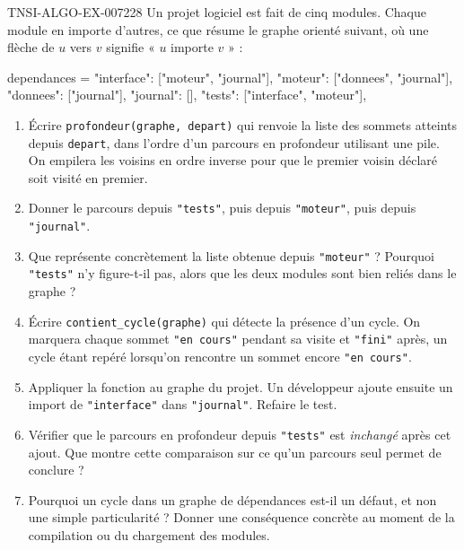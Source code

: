\begin{exercice}{TNSI-ALGO-EX-007}{2}{28}
Un projet logiciel est fait de cinq modules. Chaque module en importe d'autres,
ce que résume le graphe orienté suivant, où une flèche de $u$ vers $v$ signifie
« $u$ importe $v$ » :
\begin{python}
dependances = {
    "interface": ["moteur", "journal"],
    "moteur": ["donnees", "journal"],
    "donnees": ["journal"],
    "journal": [],
    "tests": ["interface", "moteur"],
}
\end{python}
\begin{enumerate}
  \item Écrire \lstinline{profondeur(graphe, depart)} qui renvoie la liste des
    sommets atteints depuis \lstinline{depart}, dans l'ordre d'un parcours en
    profondeur utilisant une pile. On empilera les voisins en ordre inverse pour
    que le premier voisin déclaré soit visité en premier.
  \item Donner le parcours depuis \lstinline{"tests"}, puis depuis
    \lstinline{"moteur"}, puis depuis \lstinline{"journal"}.
  \item Que représente concrètement la liste obtenue depuis
    \lstinline{"moteur"} ? Pourquoi \lstinline{"tests"} n'y figure-t-il pas,
    alors que les deux modules sont bien reliés dans le graphe ?
  \item Écrire \lstinline{contient_cycle(graphe)} qui détecte la présence d'un
    cycle. On marquera chaque sommet \lstinline{"en cours"} pendant sa visite et
    \lstinline{"fini"} après, un cycle étant repéré lorsqu'on rencontre un
    sommet encore \lstinline{"en cours"}.
  \item Appliquer la fonction au graphe du projet. Un développeur ajoute ensuite
    un import de \lstinline{"interface"} dans \lstinline{"journal"}. Refaire le
    test.
  \item Vérifier que le parcours en profondeur depuis \lstinline{"tests"} est
    \emph{inchangé} après cet ajout. Que montre cette comparaison sur ce qu'un
    parcours seul permet de conclure ?
  \item Pourquoi un cycle dans un graphe de dépendances est-il un défaut, et non
    une simple particularité ? Donner une conséquence concrète au moment de la
    compilation ou du chargement des modules.
\end{enumerate}
\end{exercice}
